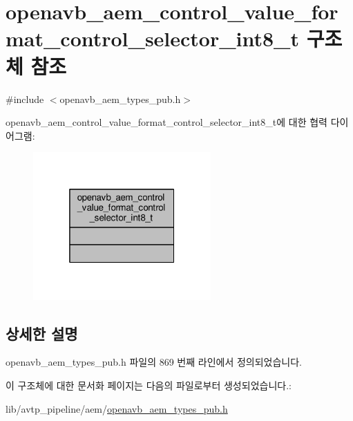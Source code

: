 \hypertarget{structopenavb__aem__control__value__format__control__selector__int8__t}{}\section{openavb\+\_\+aem\+\_\+control\+\_\+value\+\_\+format\+\_\+control\+\_\+selector\+\_\+int8\+\_\+t 구조체 참조}
\label{structopenavb__aem__control__value__format__control__selector__int8__t}


{\ttfamily \#include $<$openavb\+\_\+aem\+\_\+types\+\_\+pub.\+h$>$}



openavb\+\_\+aem\+\_\+control\+\_\+value\+\_\+format\+\_\+control\+\_\+selector\+\_\+int8\+\_\+t에 대한 협력 다이어그램\+:
\nopagebreak
\begin{figure}[H]
\begin{center}
\leavevmode
\includegraphics[width=193pt]{structopenavb__aem__control__value__format__control__selector__int8__t__coll__graph}
\end{center}
\end{figure}


\subsection{상세한 설명}


openavb\+\_\+aem\+\_\+types\+\_\+pub.\+h 파일의 869 번째 라인에서 정의되었습니다.



이 구조체에 대한 문서화 페이지는 다음의 파일로부터 생성되었습니다.\+:\begin{DoxyCompactItemize}
\item 
lib/avtp\+\_\+pipeline/aem/\hyperlink{openavb__aem__types__pub_8h}{openavb\+\_\+aem\+\_\+types\+\_\+pub.\+h}\end{DoxyCompactItemize}
